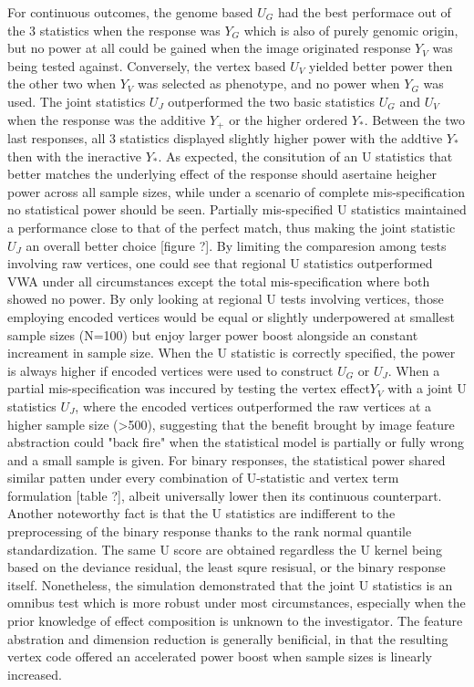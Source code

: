 For continuous outcomes, the genome based $U_G$ had the best performace out of the 3 statistics when the response was $Y_G$ which is also of purely genomic origin, but no power at all could be gained when the image originated response $Y_V$ was being tested against. Conversely, the vertex based $U_V$ yielded better power then the other two when $Y_V$ was selected as phenotype, and no power when $Y_G$ was used. The joint statistics $U_J$ outperformed the two basic statistics $U_G$ and $U_V$ when the response was the additive $Y_+$ or the higher ordered $Y_*$. Between the two last responses, all 3 statistics displayed slightly higher power with the addtive $Y_*$ then with the ineractive $Y_*$. As expected, the consitution of an U statistics that better matches the underlying effect of the response should asertaine heigher power across all sample sizes, while under a scenario of complete mis-specification no statistical power should be seen. Partially mis-specified U statistics maintained a performance close to that of the perfect match, thus making the joint statistic $U_J$ an overall better choice [figure ?].
By limiting the comparesion among tests involving raw vertices, one could see that regional U statistics outperformed VWA under all circumstances except the total mis-specification where both showed no power. By only looking at regional U tests involving vertices, those employing encoded vertices would be equal or slightly underpowered at smallest sample sizes (N=100) but enjoy larger power boost alongside an constant increament in sample size. When the U statistic is correctly specified, the power is always higher if encoded vertices were used to construct $U_G$ or $U_J$. When a partial mis-specification was inccured by testing the vertex effect$Y_V$ with a joint U statistics $U_J$, where the encoded vertices outperformed the raw vertices at a higher sample size (>500), suggesting that the benefit brought by image feature abstraction could "back fire" when the statistical model is partially or fully wrong and a small sample is given. 
For binary responses, the statistical power shared similar patten under every combination of U-statistic and vertex term formulation [table ?], albeit universally lower then its continuous counterpart. Another noteworthy fact is that the U statistics are indifferent to the preprocessing of the binary response thanks to the rank normal quantile standardization. The same U score are obtained regardless the U kernel being based on the deviance residual, the least squre resisual, or the binary response itself.
Nonetheless, the simulation demonstrated that the joint U statistics is an omnibus test which is more robust under most circumstances, especially when the prior knowledge of effect composition is unknown to the investigator. The feature abstration and dimension reduction is generally benificial, in that the resulting vertex code offered an accelerated power boost when sample sizes is linearly increased.

